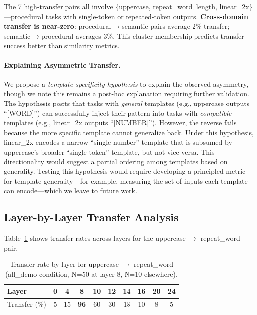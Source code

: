 \documentclass{article}
\begin{document}
The 7 high-transfer pairs all involve \{uppercase, repeat\_word, length, linear\_2x\}---procedural tasks with single-token or repeated-token outputs. \textbf{Cross-domain transfer is near-zero}: procedural$\to$semantic pairs average 2\% transfer; semantic$\to$procedural averages 3\%. This cluster membership predicts transfer success better than similarity metrics.

\paragraph{Explaining Asymmetric Transfer.} We propose a \emph{template specificity hypothesis} to explain the observed asymmetry, though we note this remains a post-hoc explanation requiring further validation. The hypothesis posits that tasks with \emph{general} templates (e.g., uppercase outputs ``[WORD]'') can successfully inject their pattern into tasks with \emph{compatible} templates (e.g., linear\_2x outputs ``[NUMBER]''). However, the reverse fails because the more specific template cannot generalize back. Under this hypothesis, linear\_2x encodes a narrow ``single number'' template that is subsumed by uppercase's broader ``single token'' template, but not vice versa. This directionality would suggest a partial ordering among templates based on generality. Testing this hypothesis would require developing a principled metric for template generality---for example, measuring the set of inputs each template can encode---which we leave to future work.

\subsection{Layer-by-Layer Transfer Analysis}

Table~\ref{tab:layer_sweep} shows transfer rates across layers for the uppercase $\to$ repeat\_word pair.

\begin{table}[h]
\centering
\small
\caption{Transfer rate by layer for uppercase $\to$ repeat\_word (all\_demo condition, N=50 at layer 8, N=10 elsewhere).}
\label{tab:layer_sweep}
\begin{tabular}{@{}lccccccccc@{}}
\toprule
Layer & 0 & 4 & 8 & 10 & 12 & 14 & 16 & 20 & 24 \\
\midrule
Transfer (\%) & 5 & 15 & \textbf{96} & 60 & 30 & 18 & 10 & 8 & 5 \\
\bottomrule
\end{tabular}
\end{table}
\end{document}
